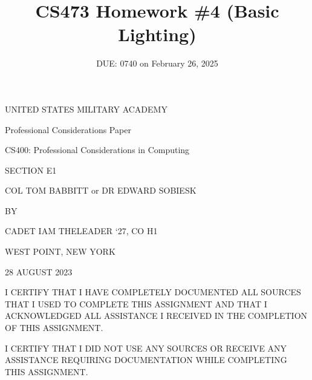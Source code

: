 \documentclass{article}
\title{CS473 Homework \#4 (Basic Lighting)}
\date{DUE: 0740 on February 26, 2025}
\begin{document}

\begin{titlepage}
\begin{centering}

UNITED STATES MILITARY ACADEMY\vspace{4em}

Professional Considerations Paper\vspace{4em}

CS400: Professional Considerations in Computing \vspace{4em}

SECTION E1\vspace{1em}

COL TOM BABBITT or DR EDWARD SOBIESK\vspace{4em}

BY\vspace{1em}

CADET IAM THELEADER `27, CO H1\vspace{1em}

WEST POINT, NEW YORK\vspace{1em}


28 AUGUST 2023\vspace{4em}

\end{centering}

\noindent
\textunderscore \textunderscore \textunderscore \textunderscore \textunderscore \textunderscore I CERTIFY THAT I HAVE COMPLETELY DOCUMENTED ALL SOURCES THAT I USED TO COMPLETE THIS ASSIGNMENT AND THAT I ACKNOWLEDGED ALL ASSISTANCE I
RECEIVED IN THE COMPLETION OF THIS ASSIGNMENT. \vspace{2em}

\noindent
\textunderscore\textunderscore\textunderscore \textunderscore \textunderscore \textunderscore I CERTIFY THAT I DID NOT USE ANY SOURCES OR RECEIVE ANY ASSISTANCE REQUIRING DOCUMENTATION WHILE COMPLETING THIS ASSIGNMENT. \vspace{2em}


\end{titlepage}
\end{document}
